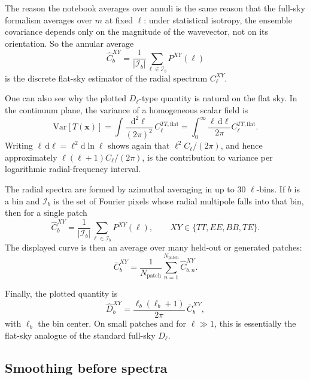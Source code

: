 \documentclass[11pt]{article}
\newcommand{\Var}{\mathrm{Var}}
\newcommand{\dd}{\mathrm{d}}
\begin{document}
The reason the notebook averages over annuli is the same reason that the full-sky formalism averages over \(m\) at fixed \(\ell\): under statistical isotropy, the ensemble covariance depends only on the magnitude of the wavevector, not on its orientation. So the annular average
\begin{equation}
  \widehat C_b^{XY}
  =
  \frac{1}{|\mathcal I_b|}
  \sum_{\bm{\ell}\in\mathcal I_b} P^{XY}(\bm{\ell})
\end{equation}
is the discrete flat-sky estimator of the radial spectrum \(C_\ell^{XY}\).

One can also see why the plotted \(D_\ell\)-type quantity is natural on the flat sky. In the continuum plane, the variance of a homogeneous scalar field is
\begin{equation}
  \Var[T(\bm{x})]
  =
  \int \frac{\dd^2\bm{\ell}}{(2\pi)^2}\,C_\ell^{TT,\mathrm{flat}}
  =
  \int_0^\infty \frac{\ell\,\dd\ell}{2\pi} C_\ell^{TT,\mathrm{flat}}.
\end{equation}
Writing \(\ell\,\dd\ell = \ell^2 \dd\ln\ell\) shows again that \(\ell^2 C_\ell/(2\pi)\), and hence approximately \(\ell(\ell+1)C_\ell/(2\pi)\), is the contribution to variance per logarithmic radial-frequency interval.

The radial spectra are formed by azimuthal averaging in up to \(30\) \(\ell\)-bins. If \(b\) is a bin and \(\mathcal{I}_b\) is the set of Fourier pixels whose radial multipole falls into that bin, then for a single patch
\begin{equation}
  \widehat C_b^{XY}
  =
  \frac{1}{|\mathcal{I}_b|}
  \sum_{\bm{\ell}\in \mathcal{I}_b} P^{XY}(\bm{\ell}),
  \qquad
  XY\in\{TT,EE,BB,TE\}.
\end{equation}
The displayed curve is then an average over many held-out or generated patches:
\begin{equation}
  \overline C_b^{XY}
  =
  \frac{1}{N_{\mathrm{patch}}}
  \sum_{n=1}^{N_{\mathrm{patch}}} \widehat C_{b,n}^{XY}.
\end{equation}

Finally, the plotted quantity is
\begin{equation}
  \widehat D_b^{XY}
  =
  \frac{\ell_b(\ell_b+1)}{2\pi}\,\overline C_b^{XY},
\end{equation}
with \(\ell_b\) the bin center. On small patches and for \(\ell\gg 1\), this is essentially the flat-sky analogue of the standard full-sky \(D_\ell\).

\subsection{Smoothing before spectra}
\end{document}
